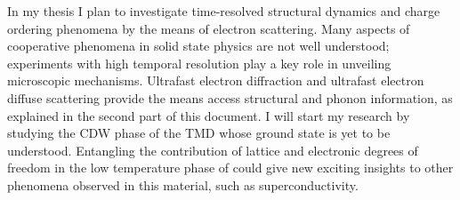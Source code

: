 In my thesis I plan to investigate time-resolved structural dynamics and charge ordering phenomena by the means of electron scattering.
Many aspects of cooperative phenomena in solid state physics are not well understood; experiments with high temporal resolution play a key role in unveiling microscopic mechanisms.
Ultrafast electron diffraction and ultrafast electron diffuse scattering provide the means access structural and phonon information, as explained in the second part of this document.
I will start my research by studying the \ac{CDW} phase of the \ac{TMD} \ts\space whose ground state is yet to be understood.
Entangling the contribution of lattice and electronic degrees of freedom in the low temperature phase of \ts\space could give new exciting insights to other phenomena observed in this material, such as superconductivity.